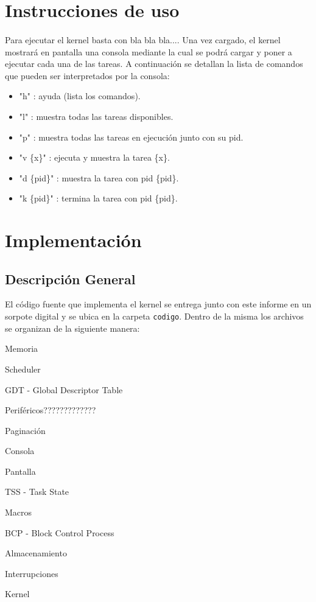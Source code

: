 \documentclass[11pt, a4paper]{article}
\begin{document}
		
\section{Instrucciones de uso}
\paragraph{}
Para ejecutar el kernel basta con bla bla bla.... Una vez cargado, el kernel mostrará en pantalla una consola mediante la cual se podrá cargar y poner a ejecutar cada una de las tareas. A continuación se detallan la lista de comandos que pueden ser interpretados por la consola:
\begin{itemize}
    \item "h" : ayuda (lista los comandos).
 	\item "l" : muestra todas las tareas disponibles.
 	\item "p" : muestra todas las tareas en ejecuci\'on junto con su pid.
 	\item "v \{x\}" : ejecuta y muestra la tarea \{x\}.
 	\item "d \{pid\}" : muestra la tarea con pid \{pid\}.
 	\item "k \{pid\}" : termina la tarea con pid \{pid\}.

\end{itemize}


\section{Implementación}
	\subsection{Descripción General}
	El código fuente que implementa el kernel se entrega junto con este informe en un sorpote digital y se ubica en la carpeta \texttt{codigo}. Dentro de la misma los archivos se organizan de la siguiente manera:
	\begin{center}
		\begin{shortitemize}
			\setlength{\shortitemwidth}{200pt}
			\item Memoria
			\item Scheduler
			\item GDT - Global Descriptor Table
			\item Periféricos?????????????
			\item Paginación				
			\item Consola
			\item Pantalla
			\item TSS - Task State
			\item Macros
			\item BCP - Block Control Process
			\item Almacenamiento
			\item Interrupciones							
			\item Kernel
		\end{shortitemize}
	\end{center}		
\end{document}
